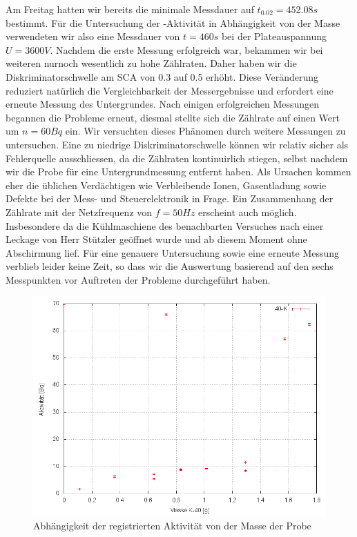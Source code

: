 Am Freitag hatten wir bereits die minimale Messdauer auf $t_{0.02} = 452.08 s$ bestimmt. Für die Untersuchung der -Aktivität in Abhängigkeit von der Masse verwendeten wir also eine Messdauer von $t = 460s$ bei der Plateauspannung $U = 3600V$.
Nachdem die erste Messung erfolgreich war, bekammen wir bei weiteren nurnoch wesentlich zu hohe Zählraten. Daher haben wir die Diskriminatorschwelle am SCA von 0.3 auf 0.5 erhöht. Diese Veränderung reduziert natürlich die Vergleichbarkeit der Messergebnisse und erfordert eine erneute Messung des Untergrundes. Nach einigen erfolgreichen Messungen begannen die Probleme erneut,
diesmal stellte sich die Zählrate auf einen Wert um $n = 60 Bq$ ein. Wir versuchten dieses Phänomen durch weitere Messungen zu untersuchen.
Eine zu niedrige Diskriminatorschwelle können wir relativ sicher als Fehlerquelle ausschliessen, da die Zählraten kontinuirlich stiegen, selbst nachdem wir die Probe für eine Untergrundmessung entfernt haben. Als Ursachen kommen eher die üblichen Verdächtigen wie Verbleibende Ionen, Gasentladung sowie Defekte bei der Mess- und Steuerelektronik in Frage.
Ein Zusammenhang der Zählrate mit der Netzfrequenz von $f = 50Hz$ erscheint auch möglich. Insbesondere da die Kühlmaschiene des benachbarten Versuches nach einer Leckage von Herr Stützler geöffnet wurde und ab diesem Moment ohne Abschirmung lief.
Für eine genauere Untersuchung sowie eine erneute Messung verblieb leider keine Zeit, so dass wir die Auswertung basierend auf den sechs Messpunkten vor Auftreten der Probleme durchgeführt haben.

\begin{figure}
 \centering \includegraphics[width = 0.99\linewidth]{Messwerte/plots/K40_massenabh.png}
 \caption{Abhängigkeit der registrierten Aktivität von der Masse der Probe}
\end{figure}

